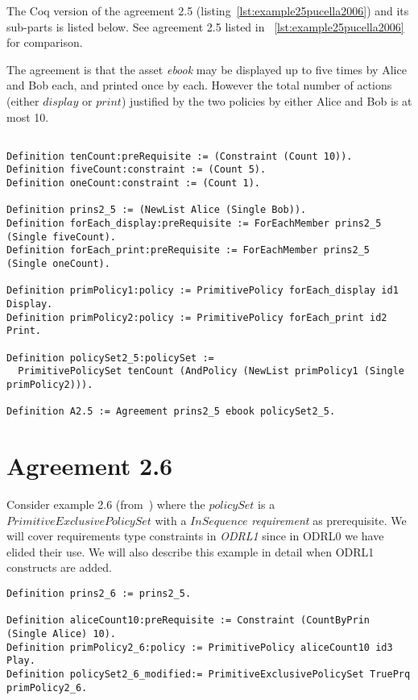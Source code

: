 The Coq version of the agreement 2.5 (listing~\ref{lst:example25pucella2006}) and its sub-parts is listed below. See agreement 2.5 listed in ~\ref{lst:example25pucella2006} for comparison.

The agreement is that the asset \emph{ebook} may be displayed up to five times by Alice and Bob each, and printed once by each. However the total number of actions (either $display$ or $print$) justified by the two policies by either Alice and Bob is at most 10.


\lstset{language=Coq}
\begin{lstlisting}[frame=single, caption={Example 2.5},label={lst:example25}]

Definition tenCount:preRequisite := (Constraint (Count 10)).
Definition fiveCount:constraint := (Count 5).
Definition oneCount:constraint := (Count 1).

Definition prins2_5 := (NewList Alice (Single Bob)).
Definition forEach_display:preRequisite := ForEachMember prins2_5 (Single fiveCount).
Definition forEach_print:preRequisite := ForEachMember prins2_5 (Single oneCount).

Definition primPolicy1:policy := PrimitivePolicy forEach_display id1 Display.
Definition primPolicy2:policy := PrimitivePolicy forEach_print id2 Print.

Definition policySet2_5:policySet :=
  PrimitivePolicySet tenCount (AndPolicy (NewList primPolicy1 (Single primPolicy2))).
                     
Definition A2.5 := Agreement prins2_5 ebook policySet2_5.

\end{lstlisting}

\section{Agreement 2.6}

Consider example 2.6 (from~\cite{pucella2006}) where the $policySet$ is a $PrimitiveExclusivePolicySet$ with a $InSequence$ \emph{requirement} as prerequisite. We will cover requirements type constraints in \emph{ODRL1} since in ODRL0 we have elided their use. We will also describe this example in detail when ODRL1 constructs are added.

 
\lstset{language=Coq}
\begin{lstlisting}[frame=single, caption={Example 2.6},label={lst:example26}]
Definition prins2_6 := prins2_5.

Definition aliceCount10:preRequisite := Constraint (CountByPrin (Single Alice) 10).
Definition primPolicy2_6:policy := PrimitivePolicy aliceCount10 id3 Play.
Definition policySet2_6_modified:= PrimitiveExclusivePolicySet TruePrq primPolicy2_6.
\end{lstlisting}





